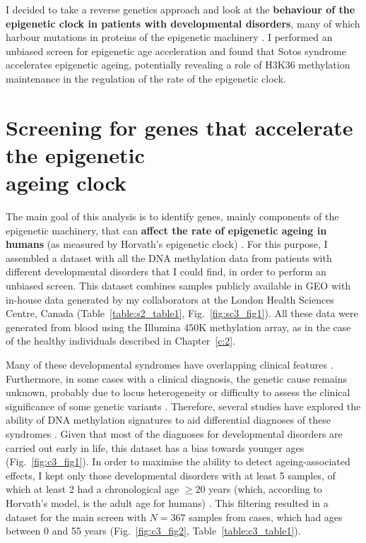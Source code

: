 \bigskip

I decided to take a reverse genetics approach and look at the \textbf{behaviour of the epigenetic clock in patients with developmental disorders}, many of which harbour mutations in proteins of the epigenetic machinery \cite{Aref-Eshghi2018,Bjornsson2015}. I performed an unbiased screen for epigenetic age acceleration and found that Sotos syndrome accelerates epigenetic ageing, potentially revealing a role of H3K36 methylation maintenance in the regulation of the rate of the epigenetic clock.

\smallskip

\section{Screening for genes that accelerate the epigenetic \\ageing clock} \label{s:3.2}

\smallskip

The main goal of this analysis is to identify genes, mainly components of the epigenetic machinery, that can \textbf{affect the rate of epigenetic ageing in humans} (as measured by Horvath’s epigenetic clock) \cite{Horvath2013}. For this purpose, I assembled a dataset with all the DNA methylation data from patients with different developmental disorders that I could find, in order to perform an unbiased screen. This dataset combines samples publicly available in GEO \cite{Edgar2002} with in-house data generated by my collaborators at the London Health Sciences Centre, Canada (Table~\ref{table:s2_table1}, Fig.~\ref{fig:sc3_fig1}). All these data were generated from blood using the Illumina 450K methylation array, as in the case of the healthy individuals described in Chapter~\ref{c:2}.   

\bigskip

Many of these developmental syndromes have overlapping clinical features \cite{Aref-Eshghi2018, Bjornsson2015}. Furthermore, in some cases with a clinical diagnosis, the genetic cause remains unknown, probably due to locus heterogeneity or difficulty to assess the clinical significance of some genetic variants \cite{Aref-Eshghi2017}. Therefore, several studies have explored the ability of DNA methylation signatures to aid differential diagnoses of these syndromes \cite{Aref-Eshghi2018,Aref-Eshghi2017,Aref-Eshghi2018a,Butcher2017,Choufani2015,Schenkel2016,Alisch2013,Schenkel2017,Hood2016,Aldinger2013,Grafodatskaya2013,Kernohan2016}. Given that most of the diagnoses for developmental disorders are carried out early in life, this dataset has a bias towards younger ages (Fig.~\ref{fig:c3_fig1}). In order to maximise the ability to detect ageing-associated effects, I kept only those developmental disorders with at least 5 samples, of which at least 2 had a chronological age $\geq 20$ years (which, according to Horvath's model, is the adult age for humans) \cite{Horvath2013}. This filtering resulted in a dataset for the main screen with $N = 367$ samples from cases, which had ages between 0 and 55 years (Fig.~\ref{fig:c3_fig2}, Table~\ref{table:c3_table1}).

